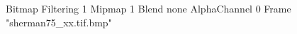{Bitmap
	{Filtering 1}
	{Mipmap 1}
	{Blend none}
	{AlphaChannel 0}
	{Frame "sherman75_xx.tif.bmp"}
}
